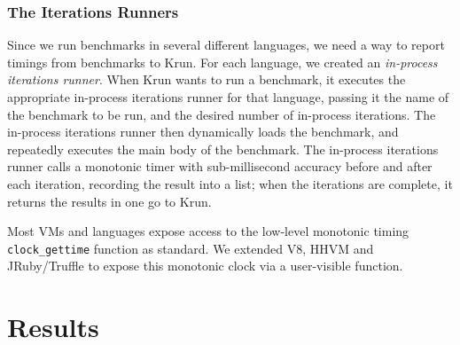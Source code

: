 \documentclass[a4paper,UKenglish]{lipics}
\newcommand{\krun}{Krun\xspace}
\begin{document}
%
%
%


\subsubsection{The Iterations Runners}

Since we run benchmarks in several different languages, we need a way to report
timings from benchmarks to \krun. For each language, we created an
\emph{in-process iterations runner}. When \krun wants to run a benchmark, it executes the
appropriate in-process iterations runner for that language, passing it the name of the
benchmark to be run, and the desired number of in-process iterations. The in-process iterations runner
then dynamically loads the benchmark, and repeatedly executes the main body of
the benchmark. The in-process iterations runner calls a monotonic timer with
sub-millisecond accuracy before and after each iteration, recording the result
into a list; when the iterations are complete, it returns the results in one go
to \krun {}.

Most VMs and languages expose access to the low-level monotonic timing
\texttt{clock\_gettime} function as standard. We extended V8, HHVM and JRuby/Truffle
to expose this monotonic clock via a user-visible function.


\section{Results}
\label{sec:Results}
\end{document}
